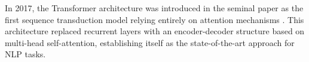 \documentclass[runningheads]{llncs}
\begin{document}
In 2017, the Transformer architecture was introduced in the seminal
paper  as the first sequence
transduction model relying entirely on attention mechanisms
\cite{NIPS2017_3f5ee243}. This architecture replaced recurrent layers
with an encoder-decoder structure based on multi-head self-attention,
establishing itself as the state-of-the-art approach for \ac{NLP}
tasks.
\end{document}
